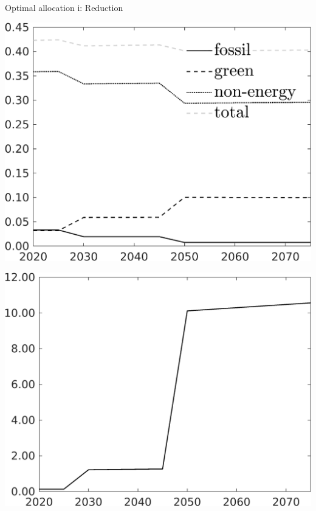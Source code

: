 \documentclass[11pt,aspectratio=169]{beamer}
\begin{document}
\begin{frame}{Optimal allocation i: Reduction}
	\begin{minipage}[]{0.32\textwidth}
		\includegraphics[width=1\textwidth]{../codding_model/own_basedOnFried/optimalPol_elastS_DisuSci/figures/all_1705/SingleJointTOT_OPT_T_NoTaus_Science_spillover0_sep1_BN0_ineq0_red0_etaa0.79_lgd1.png}
	\end{minipage}
	\begin{minipage}[]{0.32\textwidth}
		\includegraphics[width=1\textwidth]{../codding_model/own_basedOnFried/optimalPol_elastS_DisuSci/figures/all_1705/Single_OPT_T_NoTaus_GFF_spillover0_sep1_BN1_ineq0_red0_etaa0.79.png}

\end{minipage}
\end{frame}
\end{document}
